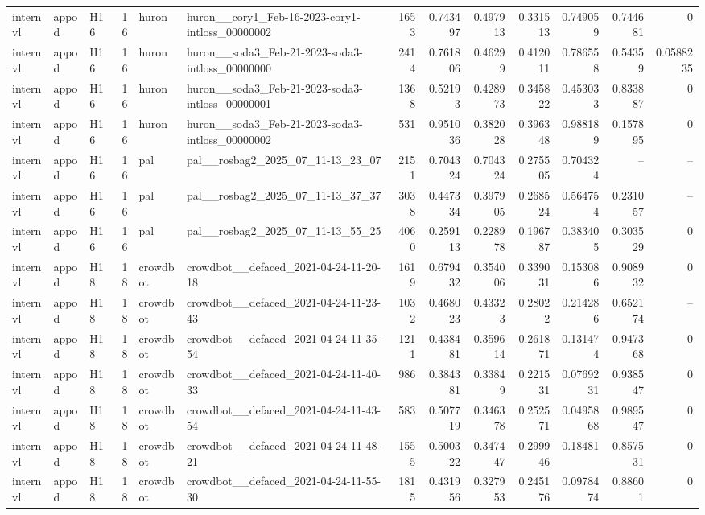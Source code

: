 \begin{longtable}{lllrllrrrrrrr}
internvl & appod & H16 & 16 & huron & huron\_\_cory1\_Feb-16-2023-cory1-intloss\_00000002 & 1653 & 0.743497 & 0.497913 & 0.331513 & 0.749059 & 0.744681 & 0 \\
internvl & appod & H16 & 16 & huron & huron\_\_soda3\_Feb-21-2023-soda3-intloss\_00000000 & 2414 & 0.761806 & 0.46299 & 0.412011 & 0.786558 & 0.54359 & 0.0588235 \\
internvl & appod & H16 & 16 & huron & huron\_\_soda3\_Feb-21-2023-soda3-intloss\_00000001 & 1368 & 0.52193 & 0.428973 & 0.345822 & 0.453033 & 0.833887 & 0 \\
internvl & appod & H16 & 16 & huron & huron\_\_soda3\_Feb-21-2023-soda3-intloss\_00000002 & 531 & 0.951036 & 0.382028 & 0.396348 & 0.988189 & 0.157895 & 0 \\
internvl & appod & H16 & 16 & pal & pal\_\_rosbag2\_2025\_07\_11-13\_23\_07 & 2151 & 0.704324 & 0.704324 & 0.275505 & 0.704324 & -- & -- \\
internvl & appod & H16 & 16 & pal & pal\_\_rosbag2\_2025\_07\_11-13\_37\_37 & 3038 & 0.447334 & 0.397905 & 0.268524 & 0.564754 & 0.231057 & -- \\
internvl & appod & H16 & 16 & pal & pal\_\_rosbag2\_2025\_07\_11-13\_55\_25 & 4060 & 0.259113 & 0.228978 & 0.196787 & 0.383405 & 0.303529 & 0 \\
internvl & appod & H18 & 18 & crowdbot & crowdbot\_\_defaced\_2021-04-24-11-20-18 & 1619 & 0.679432 & 0.354006 & 0.339031 & 0.153086 & 0.908932 & 0 \\
internvl & appod & H18 & 18 & crowdbot & crowdbot\_\_defaced\_2021-04-24-11-23-43 & 1032 & 0.468023 & 0.43323 & 0.28022 & 0.214286 & 0.652174 & -- \\
internvl & appod & H18 & 18 & crowdbot & crowdbot\_\_defaced\_2021-04-24-11-35-54 & 1211 & 0.438481 & 0.359614 & 0.261871 & 0.131474 & 0.947368 & 0 \\
internvl & appod & H18 & 18 & crowdbot & crowdbot\_\_defaced\_2021-04-24-11-40-33 & 986 & 0.384381 & 0.33849 & 0.221531 & 0.0769231 & 0.938547 & 0 \\
internvl & appod & H18 & 18 & crowdbot & crowdbot\_\_defaced\_2021-04-24-11-43-54 & 583 & 0.507719 & 0.346378 & 0.252571 & 0.0495868 & 0.989547 & 0 \\
internvl & appod & H18 & 18 & crowdbot & crowdbot\_\_defaced\_2021-04-24-11-48-21 & 1555 & 0.500322 & 0.347447 & 0.299946 & 0.18481 & 0.857531 & 0 \\
internvl & appod & H18 & 18 & crowdbot & crowdbot\_\_defaced\_2021-04-24-11-55-30 & 1815 & 0.431956 & 0.327953 & 0.245176 & 0.0978474 & 0.88601 & 0 \\

\end{longtable}
